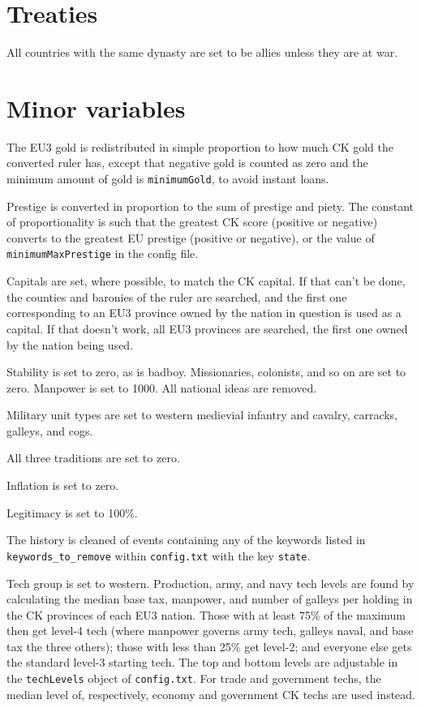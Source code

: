 \documentclass[12pt,ebook,oneside]{book}
\begin{document}
\section{Treaties}

All countries with the same dynasty are set to be allies unless they
are at war.  


\section{Minor variables}

The EU3 gold is redistributed in simple proportion to
how much CK gold the converted ruler has, except that 
negative gold is counted as zero and the minimum amount
of gold is \verb|minimumGold|, to avoid instant loans. 

Prestige is converted in proportion to the sum of prestige and
piety. The constant of proportionality is such that the greatest
CK score (positive or negative) converts to the greatest EU prestige
(positive or negative), or the value of \verb|minimumMaxPrestige| in
the config file. 

Capitals are set, where possible, to match the CK capital. If that
can't be done, the counties and baronies of the ruler are searched,
and the first one corresponding to an EU3 province owned by the nation
in question is used as a capital. If that doesn't work, all EU3
provinces are searched, the first one owned by the nation being used. 

Stability is set to zero, as is badboy. Missionaries, colonists, and
so on are set to zero. Manpower is set to 1000. All national ideas are
removed. 

Military unit types are set to western medievial infantry and cavalry,
carracks, galleys, and cogs. 

All three traditions are set to zero. 

Inflation is set to zero. 

Legitimacy is set to 100\%. 

The history is cleaned of
events containing any of the keywords listed in
\verb|keywords_to_remove|
within \verb|config.txt| with the key \verb|state|. 

Tech group is set to western. Production, army, and navy tech levels are found by calculating the
median base tax, manpower, and number of galleys per holding in the CK provinces
of each EU3 nation. Those with at least 75\% of the maximum then get level-4 tech (where
manpower governs army tech, galleys naval, and base tax the three
others); those with less than 25\% get level-2; and everyone else gets the
standard level-3 starting tech. The top and bottom levels are
adjustable in the \verb|techLevels| object of \verb|config.txt|. For
trade and government techs, the median level of, respectively, economy
and government CK techs are used instead. 
\end{document}
